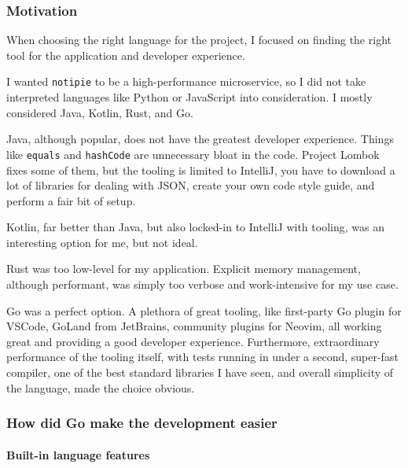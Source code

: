 \hypertarget{motivation}{%
	\subsubsection{Motivation}\label{motivation}}

When choosing the right language for the project, I focused on finding
the right tool for the application and developer experience.

I wanted \texttt{notipie} to be a high-performance microservice, so I
did not take interpreted languages like Python or JavaScript into
consideration. I mostly considered Java, Kotlin, Rust, and Go.

Java, although popular, does not have the greatest developer experience.
Things like \texttt{equals} and \texttt{hashCode} are unnecessary bloat
in the code. Project Lombok fixes some of them, but the tooling is
limited to IntelliJ, you have to download a lot of libraries for dealing
with JSON, create your own code style guide, and perform a fair bit of
setup.

Kotlin, far better than Java, but also locked-in to IntelliJ with
tooling, was an interesting option for me, but not ideal.

Rust was too low-level for my application. Explicit memory management,
although performant, was simply too verbose and work-intensive for my
use case.

Go was a perfect option. A plethora of great tooling, like first-party
Go plugin for VSCode, GoLand from JetBrains, community plugins for
Neovim, all working great and providing a good developer experience.
Furthermore, extraordinary performance of the tooling itself, with tests
running in under a second, super-fast compiler, one of the best standard
libraries I have seen, and overall simplicity of the language, made the
choice obvious.

\hypertarget{how-did-go-make-the-development-easier}{%
	\subsubsection{How did Go make the development
		easier}\label{how-did-go-make-the-development-easier}}

\hypertarget{built-in-language-features}{%
	\paragraph{Built-in language
		features}\label{built-in-language-features}}

